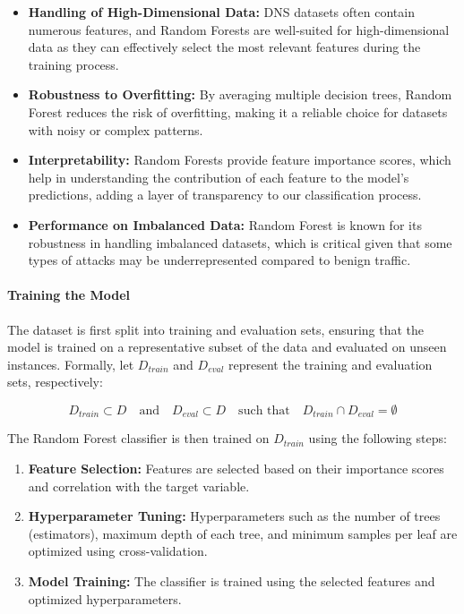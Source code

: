 \begin{itemize}
    \item \textbf{Handling of High-Dimensional Data:} DNS datasets often contain numerous features, and Random Forests are well-suited for high-dimensional data as they can effectively select the most relevant features during the training process.

    \item \textbf{Robustness to Overfitting:} By averaging multiple decision trees, Random Forest reduces the risk of overfitting, making it a reliable choice for datasets with noisy or complex patterns.

    \item \textbf{Interpretability:} Random Forests provide feature importance scores, which help in understanding the contribution of each feature to the model's predictions, adding a layer of transparency to our classification process.

    \item \textbf{Performance on Imbalanced Data:} Random Forest is known for its robustness in handling imbalanced datasets, which is critical given that some types of attacks may be underrepresented compared to benign traffic.
\end{itemize}

\paragraph{Training the Model}
The dataset is first split into training and evaluation sets, ensuring that the model is trained on a representative subset of the data and evaluated on unseen instances. Formally, let \(D_{train}\) and \(D_{eval}\) represent the training and evaluation sets, respectively:

\[ D_{train} \subset D \quad \text{and} \quad D_{eval} \subset D \quad \text{such that} \quad D_{train} \cap D_{eval} = \emptyset \]

The Random Forest classifier is then trained on \(D_{train}\) using the following steps:

\begin{enumerate}
    \item \textbf{Feature Selection:} Features are selected based on their importance scores and correlation with the target variable.
    \item \textbf{Hyperparameter Tuning:} Hyperparameters such as the number of trees (estimators), maximum depth of each tree, and minimum samples per leaf are optimized using cross-validation.
    \item \textbf{Model Training:} The classifier is trained using the selected features and optimized hyperparameters.
\end{enumerate}

